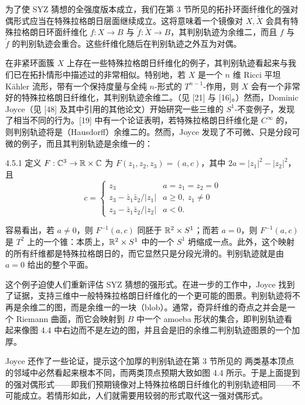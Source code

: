 为了使 SYZ 猜想的全强度版本成立，我们在第 3 节所见的拓扑环面纤维化的强对偶形式应当在特殊拉格朗日层面继续成立。这将意味着一个镜像对 $X,\check X$ 会具有特殊拉格朗日环面纤维化 $f:X\to B$ 与 $\check f:\check X\to B$，其判别轨迹为余维二，而且 $f$ 与 $\check f$ 的判别轨迹会重合。这些纤维化随后在判别轨迹之外互为对偶。

在非紧环面簇 $X$ 上存在一些特殊拉格朗日纤维化的例子，其判别轨迹看起来与我们已在拓扑情形中描述过的非常相似。特别地，若 $X$ 是一个 $n$ 维 Ricci 平坦 Kähler 流形，带有一个保持度量与全纯 $n$-形式的 $T^{n-1}$-作用，则 $X$ 会有一个非常好的特殊拉格朗日纤维化，其判别轨迹余维二。（见 [21] 与 [16]。）然而，Dominic Joyce（见 [48] 及其中引用的其他论文）开始研究一些三维的 $S^1$-不变例子，发现了相当不同的行为。[19] 中有一个论证表明，若特殊拉格朗日纤维化是 $C^\infty$ 的，则判别轨迹将是（Hausdorff）余维二的。然而，Joyce 发现了不可微、只是分段可微的例子，而且其判别轨迹是余维一的：

\begin{example}{4.5.1}
定义 $F:\mathbb{C}^3\to\mathbb{R}\times\mathbb{C}$ 为 $F(z_1,z_2,z_3)=(a,c)$，其中 $2a=|z_1|^2-|z_2|^2$，且
\[
c=\begin{cases}
z_3 & a=z_1=z_2=0\\
z_3-\bar z_1\bar z_2/|z_1| & a\ge0,\ z_1\ne0\\
z_3-\bar z_1\bar z_2/|z_2| & a<0.
\end{cases}
\]
\end{example}

容易看出，若 $a\ne0$，则 $F^{-1}(a,c)$ 同胚于 $\mathbb{R}^2\times S^1$；而若 $a=0$，则 $F^{-1}(a,c)$ 是 $T^2$ 上的一个锥：本质上，$\mathbb{R}^2\times S^1$ 中的一个 $S^1$ 坍缩成一点。此外，这个映射的所有纤维都是特殊拉格朗日的，而它显然只是分段光滑的。判别轨迹就是由 $a=0$ 给出的整个平面。

这个例子迫使人们重新评估 SYZ 猜想的强形式。在进一步的工作中，Joyce 找到了证据，支持三维中一般特殊拉格朗日纤维化的一个更可能的图景。判别轨迹将不再是余维二的图，而是余维一的一块（blob）。通常，奇异纤维的奇点之并会是一个 Riemann 曲面，而它会映射到 $B$ 中一个 amoeba 形状的集合，即判别轨迹看起来像图 4.4 中右边而不是左边的图，并且会是旧的余维二判别轨迹图景的一个加厚。

Joyce 还作了一些论证，提示这个加厚的判别轨迹在第 3 节所见的
两类基本顶点的邻域中必然看起来根本不同，而两类顶点预期大致如图 4.4 所示。于是上面提到的强对偶形式------即我们预期镜像对上特殊拉格朗日纤维化的判别轨迹相同------不可能成立。若情形如此，人们就需要用较弱的形式取代这一强对偶形式。

